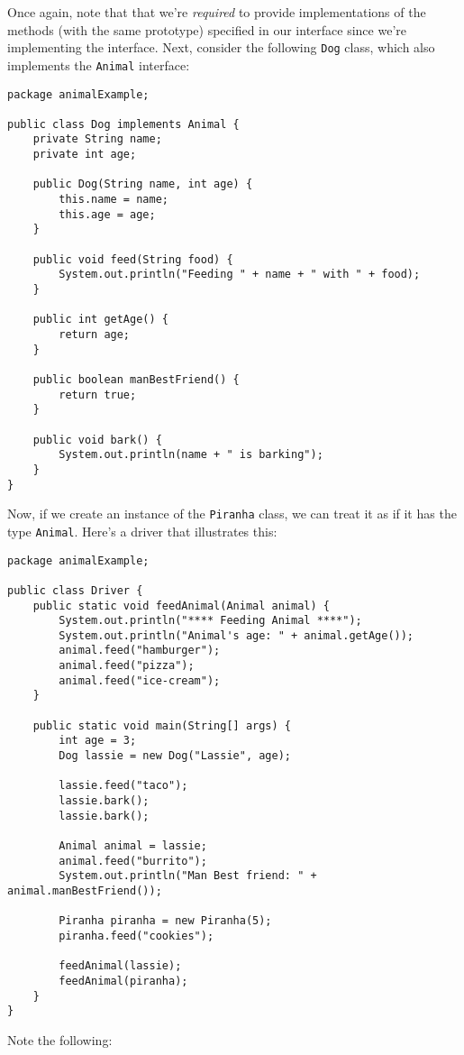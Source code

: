 Once again, note that that we're \textit{required} to provide implementations of the methods (with the same prototype) specified in our interface since we're implementing the interface. Next, consider the following \verb!Dog! class, which also implements the \verb!Animal! interface:


\begin{lstlisting}
package animalExample;

public class Dog implements Animal {
	private String name;
	private int age;

	public Dog(String name, int age) {
		this.name = name;
		this.age = age;
	}

	public void feed(String food) {
		System.out.println("Feeding " + name + " with " + food);
	}

	public int getAge() {
		return age;
	}

	public boolean manBestFriend() {
		return true;
	}

	public void bark() {
		System.out.println(name + " is barking");
	}
}
\end{lstlisting}


Now, if we create an instance of the \verb!Piranha! class, we can treat it as if it has the type \verb!Animal!. Here's a driver that illustrates this:

\begin{lstlisting}
package animalExample;

public class Driver {
	public static void feedAnimal(Animal animal) {
		System.out.println("**** Feeding Animal ****");
		System.out.println("Animal's age: " + animal.getAge());
		animal.feed("hamburger");
		animal.feed("pizza");
		animal.feed("ice-cream");
	}

	public static void main(String[] args) {
		int age = 3;
		Dog lassie = new Dog("Lassie", age);

		lassie.feed("taco");
		lassie.bark();
		lassie.bark();

		Animal animal = lassie;
		animal.feed("burrito");
		System.out.println("Man Best friend: " + animal.manBestFriend());

		Piranha piranha = new Piranha(5);
		piranha.feed("cookies");

		feedAnimal(lassie);
		feedAnimal(piranha);
	}
}
\end{lstlisting}

Note the following:


